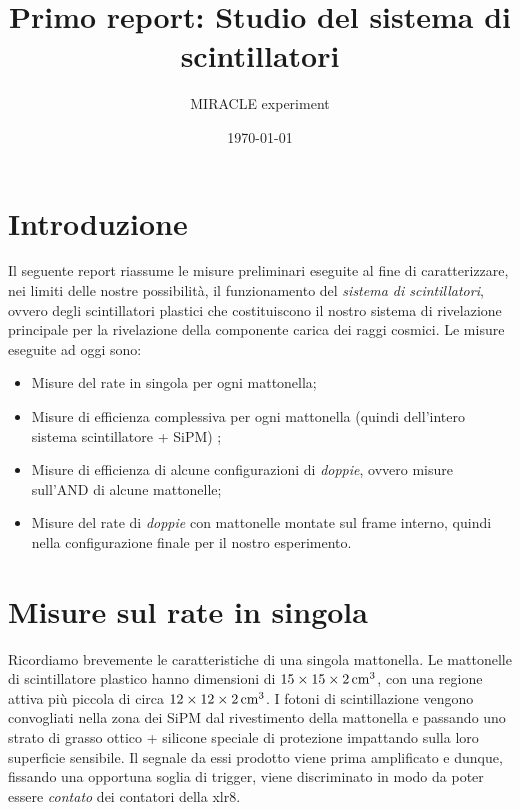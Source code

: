 \documentclass[11pt,a4paper]{article}
\title{Primo report: Studio del sistema di scintillatori}
\author{MIRACLE experiment}
\date{\today}
\begin{document}
\maketitle
\section{Introduzione}
Il seguente report riassume le misure preliminari eseguite al fine di caratterizzare, nei limiti delle nostre possibilità, il funzionamento del \textit{sistema di scintillatori}, ovvero degli scintillatori plastici che costituiscono il nostro sistema di rivelazione principale per la rivelazione della componente carica dei raggi cosmici. Le misure eseguite ad oggi sono:
\begin{itemize}
    \item Misure del rate in singola per ogni mattonella;
    \item Misure di efficienza complessiva per ogni mattonella (quindi dell'intero sistema scintillatore + SiPM) ;
    \item Misure di efficienza di alcune configurazioni di \textit{doppie}, ovvero misure sull'AND di alcune mattonelle;
    \item Misure del rate di \textit{doppie} con mattonelle montate sul frame interno, quindi nella configurazione finale per il nostro esperimento.
\end{itemize}

\section{Misure sul rate in singola}
Ricordiamo brevemente le caratteristiche di una singola mattonella. Le mattonelle di scintillatore plastico hanno dimensioni di $15\times15\times2\, \rm{cm^3}$, con una regione attiva più piccola di circa $12\times12\times2\, \rm{cm^3}$. I fotoni di scintillazione vengono convogliati nella zona dei SiPM dal rivestimento della mattonella e passando uno strato di grasso ottico + silicone speciale di protezione impattando sulla loro superficie sensibile. 
Il segnale da essi prodotto viene prima amplificato e dunque, fissando una opportuna soglia di trigger, viene discriminato in modo da poter essere \textit{contato} dei contatori della xlr8.
\end{document}
